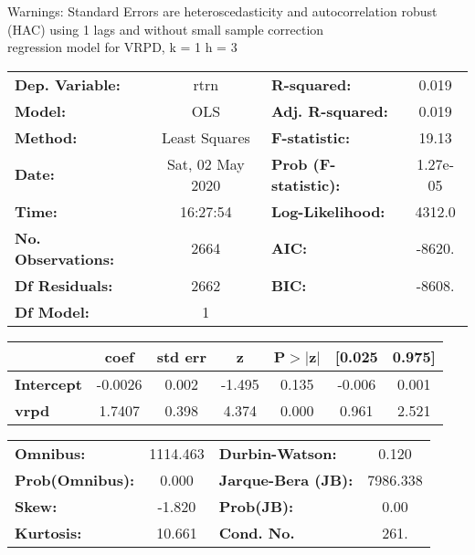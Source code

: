 Warnings: \newline
 [1] Standard Errors are heteroscedasticity and autocorrelation robust (HAC) using 1 lags and without small sample correction\\ 

regression model for VRPD, k = 1 h = 3\begin{center}
\begin{tabular}{lclc}
\toprule
\textbf{Dep. Variable:}    &       rtrn       & \textbf{  R-squared:         } &     0.019   \\
\textbf{Model:}            &       OLS        & \textbf{  Adj. R-squared:    } &     0.019   \\
\textbf{Method:}           &  Least Squares   & \textbf{  F-statistic:       } &     19.13   \\
\textbf{Date:}             & Sat, 02 May 2020 & \textbf{  Prob (F-statistic):} &  1.27e-05   \\
\textbf{Time:}             &     16:27:54     & \textbf{  Log-Likelihood:    } &    4312.0   \\
\textbf{No. Observations:} &        2664      & \textbf{  AIC:               } &    -8620.   \\
\textbf{Df Residuals:}     &        2662      & \textbf{  BIC:               } &    -8608.   \\
\textbf{Df Model:}         &           1      & \textbf{                     } &             \\
\bottomrule
\end{tabular}
\begin{tabular}{lcccccc}
                   & \textbf{coef} & \textbf{std err} & \textbf{z} & \textbf{P$> |$z$|$} & \textbf{[0.025} & \textbf{0.975]}  \\
\midrule
\textbf{Intercept} &      -0.0026  &        0.002     &    -1.495  &         0.135        &       -0.006    &        0.001     \\
\textbf{vrpd}      &       1.7407  &        0.398     &     4.374  &         0.000        &        0.961    &        2.521     \\
\bottomrule
\end{tabular}
\begin{tabular}{lclc}
\textbf{Omnibus:}       & 1114.463 & \textbf{  Durbin-Watson:     } &    0.120  \\
\textbf{Prob(Omnibus):} &   0.000  & \textbf{  Jarque-Bera (JB):  } & 7986.338  \\
\textbf{Skew:}          &  -1.820  & \textbf{  Prob(JB):          } &     0.00  \\
\textbf{Kurtosis:}      &  10.661  & \textbf{  Cond. No.          } &     261.  \\
\bottomrule
\end{tabular}
\end{center}

